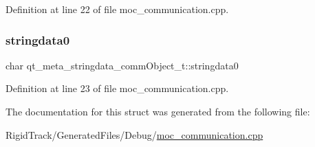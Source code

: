 Definition at line 22 of file moc\+\_\+communication.\+cpp.

\mbox{\label{structqt__meta__stringdata__comm_object__t_a6206d59bc929b76a102101c37f263f52}} 
\subsubsection{\texorpdfstring{stringdata0}{stringdata0}}
{\footnotesize\ttfamily char qt\+\_\+meta\+\_\+stringdata\+\_\+comm\+Object\+\_\+t\+::stringdata0}



Definition at line 23 of file moc\+\_\+communication.\+cpp.



The documentation for this struct was generated from the following file\+:\begin{DoxyCompactItemize}
\item 
Rigid\+Track/\+Generated\+Files/\+Debug/\hyperlink{_debug_2moc__communication_8cpp}{moc\+\_\+communication.\+cpp}\end{DoxyCompactItemize}
